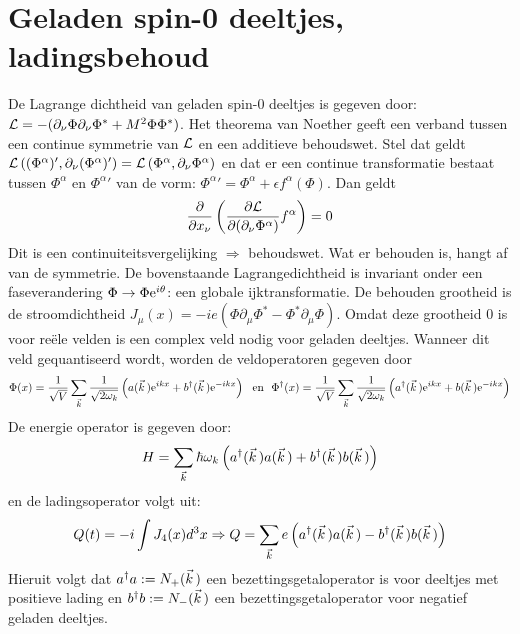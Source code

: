 \documentclass[twoside]{report}
\begin{document}
\section[~~Geladen spin-0 deeltjes, ladingsbehoud]{Geladen spin-0 deeltjes, ladingsbehoud}
De Lagrange dichtheid van geladen spin-0 deeltjes is gegeven door:
${\cal L}=-(\partial_\nu\Phi\partial_\nu\Phi^*+M^2\Phi\Phi^*)$.
\npar
Het theorema van Noether geeft een verband tussen een continue symmetrie van
${\cal L}$ en een additieve behoudswet. Stel dat geldt
${\cal L}\left((\Phi^\alpha)',\partial_\nu(\Phi^\alpha)'\right)=
{\cal L}\left(\Phi^\alpha,\partial_\nu\Phi^\alpha\right)$ en dat er een continue
transformatie bestaat tussen $\Phi^\alpha$ en ${\Phi^\alpha}'$ van de vorm:
${\Phi^\alpha}'=\Phi^\alpha+\epsilon f^\alpha(\Phi)$. Dan geldt
\[
\frac{\partial }{\partial x_\nu}\left(\frac{\partial {\cal L}}{\partial (\partial_\nu\Phi^\alpha)}f^\alpha\right)=0
\]
Dit is een continuiteitsvergelijking $\Rightarrow$ behoudswet. Wat er
behouden is, hangt af van de symmetrie. De bovenstaande Lagrangedichtheid is
invariant onder een faseverandering $\Phi\rightarrow\Phi{\rm e}^{i\theta}$:
een globale ijktransformatie. De behouden grootheid is de stroomdichtheid
$J_\mu(x)=-ie(\Phi\partial_\mu\Phi^*-\Phi^*\partial_\mu\Phi)$. Omdat deze
grootheid 0 is voor re\"ele velden is een complex veld nodig voor geladen
deeltjes. Wanneer dit veld gequantiseerd wordt, worden de veldoperatoren
gegeven door
\[
\Phi(x)=\frac{1}{\sqrt{V}}\sum_{\vec{k}}\frac{1}{\sqrt{2\omega_k}}
\left(a(\vec{k}\,){\rm e}^{ikx}+b^\dagger(\vec{k}\,){\rm e}^{-ikx}\right)
~~\mbox{en}~~
\Phi^\dagger(x)=\frac{1}{\sqrt{V}}\sum_{\vec{k}}\frac{1}{\sqrt{2\omega_k}}
\left(a^\dagger(\vec{k}\,){\rm e}^{ikx}+b(\vec{k}\,){\rm e}^{-ikx}\right)
\]
De energie operator is gegeven door:
\[
H=\sum_{\vec{k}}\hbar\omega_k\left(a^\dagger(\vec{k}\,)a(\vec{k}\,)+b^\dagger(\vec{k}\,)b(\vec{k}\,)\right)
\]
en de ladingsoperator volgt uit:
\[
Q(t)=-i\int J_4(x)d^3x\Rightarrow Q=\sum_{\vec{k}}e\left(a^\dagger(\vec{k}\,)a(\vec{k}\,)-b^\dagger(\vec{k}\,)b(\vec{k}\,)\right)
\]
Hieruit volgt dat $a^\dagger a:=N_+(\vec{k}\,)$ een bezettingsgetaloperator is
voor deeltjes met positieve lading en $b^\dagger b:=N_-(\vec{k}\,)$ een
bezettingsgetaloperator voor negatief geladen deeltjes.
\end{document}
